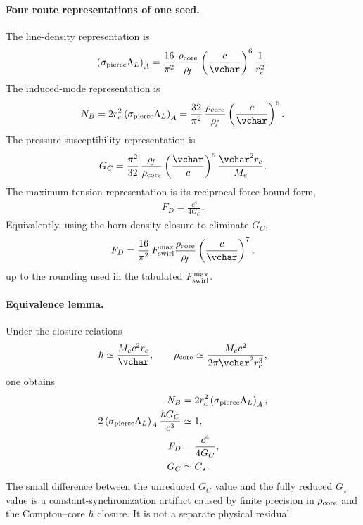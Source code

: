 \paragraph{Four route representations of one seed.}
The line-density representation is
\begin{align}
    \left(\sigma_{\rm pierce}\Lambda_L\right)_A
    =
    \frac{16}{\pi^2}\,
    \frac{\rho_{\rm core}}{\rho_{\!f}}
    \left(\frac{c}{\vchar}\right)^6
    \frac{1}{r_c^2} .
    \label{eq:rt_planck_v3_route_A}
\end{align}
The induced-mode representation is
\begin{align}
    N_B
    =
    2r_c^2\left(\sigma_{\rm pierce}\Lambda_L\right)_A
    =
    \frac{32}{\pi^2}\,
    \frac{\rho_{\rm core}}{\rho_{\!f}}
    \left(\frac{c}{\vchar}\right)^6 .
    \label{eq:rt_planck_v3_route_B}
\end{align}
The pressure-susceptibility representation is
\begin{align}
    G_C
    =
    \frac{\pi^2}{32}\,
    \frac{\rho_{\!f}}{\rho_{\rm core}}
    \left(\frac{\vchar}{c}\right)^5
    \frac{\vchar^2r_c}{M_e} .
    \label{eq:rt_planck_v3_route_C}
\end{align}
The maximum-tension representation is its reciprocal force-bound form,
\begin{align}
    F_D=\frac{c^4}{4G_C}.
    \label{eq:rt_planck_v3_route_D}
\end{align}
Equivalently, using the horn-density closure to eliminate \(G_C\),
\begin{align}
    F_D
    =
    \frac{16}{\pi^2}\,
    F_{\rm swirl}^{\max}
    \frac{\rho_{\rm core}}{\rho_{\!f}}
    \left(\frac{c}{\vchar}\right)^7,
\end{align}
up to the rounding used in the tabulated \(F_{\rm swirl}^{\max}\).

\paragraph{Equivalence lemma.}
Under the closure relations
\begin{align}
    \hbar\simeq\frac{M_ec^2r_c}{\vchar},
    \qquad
    \rho_{\rm core}\simeq
    \frac{M_ec^2}{2\pi\vchar^2r_c^3},
\end{align}
one obtains
\begin{align}
    N_B
    &=2r_c^2\left(\sigma_{\rm pierce}\Lambda_L\right)_A,
    \\
    2\left(\sigma_{\rm pierce}\Lambda_L\right)_A
    \frac{\hbar G_C}{c^3}
    &\simeq1,
    \\
    F_D&=\frac{c^4}{4G_C},
    \\
    G_C&\simeq G_{\star}.
\end{align}
The small difference between the unreduced \(G_C\) value and the fully reduced
\(G_{\star}\) value is a constant-synchronization artifact caused by finite
precision in \(\rho_{\rm core}\) and the Compton--core \(\hbar\) closure.  It is
not a separate physical residual.


